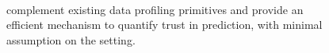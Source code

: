 \begin{figure}[t]
{\begin{tabular}
		\hline
		\\

	\end{tabular}
	} 	
	\vspace{-4mm} 	
	\caption{\Dis complement existing data profiling primitives and provide an 
	efficient mechanism to quantify trust in prediction, with
	minimal assumption on the setting. 
    } 
	\label{relatedWorkMatrix} 
	\vspace{-4mm} 
	
\end{figure}
